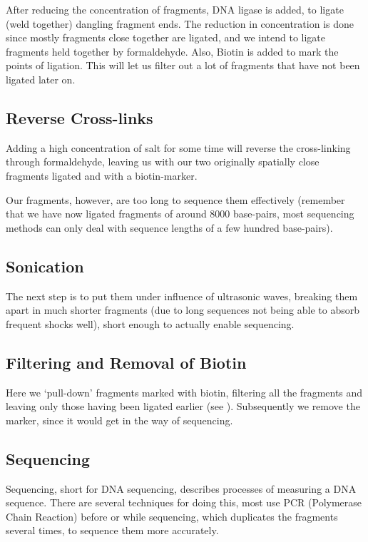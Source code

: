 After reducing the concentration of fragments, DNA ligase is added, to ligate
(weld together) dangling fragment ends. The reduction in concentration is done
since mostly fragments close together are ligated, and we intend to ligate
fragments held together by formaldehyde. Also, Biotin is added to mark the
points of ligation. This will let us filter out a lot of fragments that have
not been ligated later on.


\subsection{Reverse Cross-links}\label{sec:revcrosslink}

Adding a high concentration of salt for some time will reverse the
cross-linking through formaldehyde, leaving us with our two originally
spatially close fragments ligated and with a biotin-marker.

Our fragments, however, are too long to sequence them effectively (remember
that we have now ligated fragments of around 8000 base-pairs, most sequencing
methods can only deal with sequence lengths of a few hundred base-pairs).

\subsection{Sonication}\label{sec:sonication}

The next step is to put them under influence of ultrasonic waves, breaking them
apart in much shorter fragments (due to long sequences not being able to absorb
frequent shocks well), short enough to actually enable sequencing.

\subsection{Filtering and Removal of Biotin}\label{sec:pulldown}

Here we `pull-down' fragments marked with biotin, filtering all the fragments
and leaving only those having been ligated earlier (see ).
Subsequently we remove the marker, since it would get in the way of sequencing.

\subsection{Sequencing}\label{sec:sequencing}

Sequencing, short for DNA sequencing, describes processes of measuring a DNA
sequence. There are several techniques for doing this, most use PCR (Polymerase
Chain Reaction) before or while sequencing, which duplicates the fragments
several times, to sequence them more accurately.

